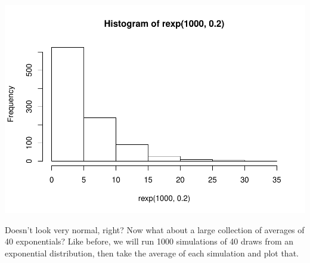 \documentclass[
]{article}
\begin{document}
\includegraphics{C6Project_files/figure-latex/exponentialcurve-1.pdf}

Doesn't look very normal, right? Now what about a large collection of
averages of 40 exponentials? Like before, we will run 1000 simulations
of 40 draws from an exponential distribution, then take the average of
each simulation and plot that.
\end{document}
